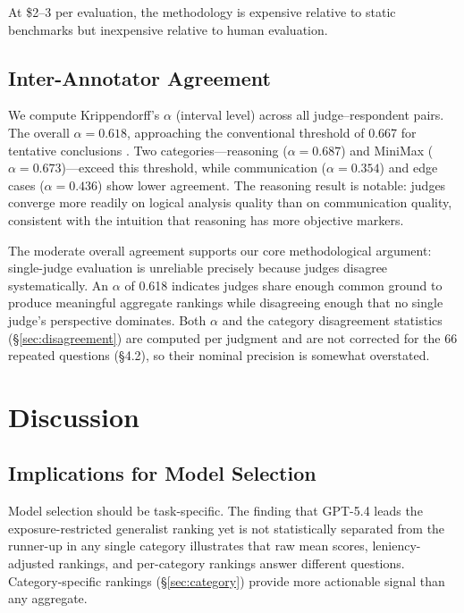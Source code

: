 \documentclass{article}
\begin{document}
At \$2--3 per evaluation, the methodology is expensive relative to static benchmarks but inexpensive relative to human evaluation.

\subsection{Inter-Annotator Agreement}
\label{sec:iaa}

We compute Krippendorff's $\alpha$ (interval level) across all judge--respondent pairs. The overall $\alpha = 0.618$, approaching the conventional threshold of 0.667 for tentative conclusions \citep{krippendorff2011computing}. Two categories---reasoning ($\alpha = 0.687$) and MiniMax ($\alpha = 0.673$)---exceed this threshold, while communication ($\alpha = 0.354$) and edge cases ($\alpha = 0.436$) show lower agreement. The reasoning result is notable: judges converge more readily on logical analysis quality than on communication quality, consistent with the intuition that reasoning has more objective markers.

The moderate overall agreement supports our core methodological argument: single-judge evaluation is unreliable precisely because judges disagree systematically. An $\alpha$ of 0.618 indicates judges share enough common ground to produce meaningful aggregate rankings while disagreeing enough that no single judge's perspective dominates. Both $\alpha$ and the category disagreement statistics (\S\ref{sec:disagreement}) are computed per judgment and are not corrected for the 66 repeated questions (\S4.2), so their nominal precision is somewhat overstated.


\section{Discussion}

\subsection{Implications for Model Selection}

Model selection should be task-specific. The finding that GPT-5.4 leads the exposure-restricted generalist ranking yet is not statistically separated from the runner-up in any single category illustrates that raw mean scores, leniency-adjusted rankings, and per-category rankings answer different questions. Category-specific rankings (\S\ref{sec:category}) provide more actionable signal than any aggregate.
\end{document}
